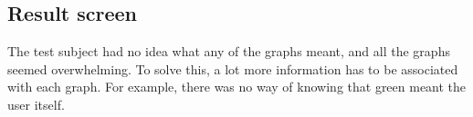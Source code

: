 \subsection{Result screen}
The test subject had no idea what any of the graphs meant, and all the graphs
seemed overwhelming. To solve this, a lot more information has to be
associated with each graph. For example, there was no way of knowing that green
meant the user itself. 






















